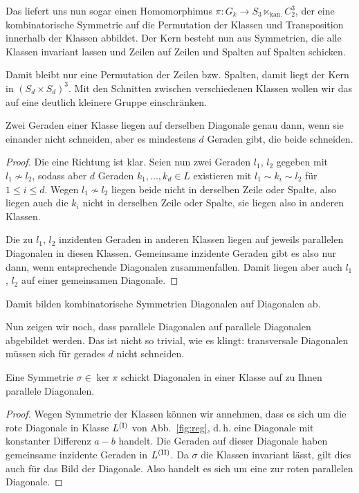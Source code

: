 Das liefert uns nun sogar einen Homomorphimus $\pi \colon G_k \to S_3 \ltimes_{\text{kan.}} C_2^3$, der eine kombinatorische Symmetrie auf die Permutation der Klassen und Transposition innerhalb der Klassen abbildet. Der Kern besteht nun aus Symmetrien, die alle Klassen invariant lassen und Zeilen auf Zeilen und Spalten auf Spalten schicken.

Damit bleibt nur eine Permutation der Zeilen bzw. Spalten, damit liegt der Kern in $(S_d \times S_d)^3$. Mit den Schnitten zwischen verschiedenen Klassen wollen wir das auf eine deutlich kleinere Gruppe einschränken.
\begin{prop}
Zwei Geraden einer Klasse liegen auf derselben Diagonale genau dann, wenn sie einander nicht schneiden, aber es mindestens $d$ Geraden gibt, die beide schneiden.
\end{prop}
\begin{proof}
Die eine Richtung ist klar. Seien nun zwei Geraden $l_1$, $l_2$ gegeben mit $l_1 \not\sim l_2$, sodass aber $d$ Geraden $k_1, \dots, k_d \in L$ existieren mit $l_1 \sim k_i \sim l_2$ für $1 \leq i \leq d$. Wegen $l_1 \not\sim l_2$ liegen beide nicht in derselben Zeile oder Spalte, also liegen auch die $k_i$ nicht in derselben Zeile oder Spalte, sie liegen also in anderen Klassen.

Die zu $l_1$, $l_2$ inzidenten Geraden in anderen Klassen liegen auf jeweils parallelen Diagonalen in diesen Klassen. Gemeinsame inzidente Geraden gibt es also nur dann, wenn entsprechende Diagonalen zusammenfallen. Damit liegen aber auch $l_1$, $l_2$ auf einer gemeinsamen Diagonale.
\end{proof}
\begin{coroll}
Damit bilden kombinatorische Symmetrien Diagonalen auf Diagonalen ab.
\end{coroll}
Nun zeigen wir noch, dass parallele Diagonalen auf parallele Diagonalen abgebildet werden. Das ist nicht so trivial, wie es klingt: transversale Diagonalen müssen sich für gerades $d$ nicht schneiden.
\begin{prop}
Eine Symmetrie $\sigma \in \ker \pi$ schickt Diagonalen in einer Klasse auf zu Ihnen parallele Diagonalen.
\end{prop}
\begin{proof}
Wegen Symmetrie der Klassen können wir annehmen, dass es sich um die rote Diagonale in Klasse $\Lcl(I)$ von Abb.~\ref{fig:reg}, d.\,h. eine Diagonale mit konstanter Differenz $a-b$ handelt. Die Geraden auf dieser Diagonale haben gemeinsame inzidente Geraden in $\Lcl(II)$. Da $\sigma$ die Klassen invariant lässt, gilt dies auch für das Bild der Diagonale. Also handelt es sich um eine zur roten parallelen Diagonale.
\end{proof}

